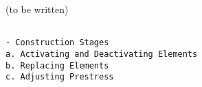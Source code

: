 (to be written)

\begin{verbatim}

- Construction Stages
a. Activating and Deactivating Elements
b. Replacing Elements
c. Adjusting Prestress

\end{verbatim}
